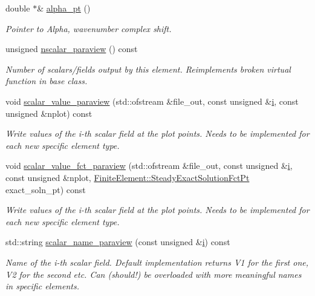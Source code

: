 \begin{DoxyCompactItemize}
double $\ast$\& \hyperlink{classoomph_1_1PMLHelmholtzEquationsBase_aaf031eceaf091f839e349040d88f69bf}{alpha\+\_\+pt} ()
\begin{DoxyCompactList}\small\item\em Pointer to Alpha, wavenumber complex shift. \end{DoxyCompactList}\item 
unsigned \hyperlink{classoomph_1_1PMLHelmholtzEquationsBase_a7829f282edace6ed23d2042defb15186}{nscalar\+\_\+paraview} () const
\begin{DoxyCompactList}\small\item\em Number of scalars/fields output by this element. Reimplements broken virtual function in base class. \end{DoxyCompactList}\item 
void \hyperlink{classoomph_1_1PMLHelmholtzEquationsBase_aaeb408e55bccd67d03e70fe85cb1de9d}{scalar\+\_\+value\+\_\+paraview} (std\+::ofstream \&file\+\_\+out, const unsigned \&\hyperlink{cfortran_8h_adb50e893b86b3e55e751a42eab3cba82}{i}, const unsigned \&nplot) const
\begin{DoxyCompactList}\small\item\em Write values of the i-\/th scalar field at the plot points. Needs to be implemented for each new specific element type. \end{DoxyCompactList}\item 
void \hyperlink{classoomph_1_1PMLHelmholtzEquationsBase_a8285b79905851ee6bed5d8e25435ece2}{scalar\+\_\+value\+\_\+fct\+\_\+paraview} (std\+::ofstream \&file\+\_\+out, const unsigned \&\hyperlink{cfortran_8h_adb50e893b86b3e55e751a42eab3cba82}{i}, const unsigned \&nplot, \hyperlink{classoomph_1_1FiniteElement_a690fd33af26cc3e84f39bba6d5a85202}{Finite\+Element\+::\+Steady\+Exact\+Solution\+Fct\+Pt} exact\+\_\+soln\+\_\+pt) const
\begin{DoxyCompactList}\small\item\em Write values of the i-\/th scalar field at the plot points. Needs to be implemented for each new specific element type. \end{DoxyCompactList}\item 
std\+::string \hyperlink{classoomph_1_1PMLHelmholtzEquationsBase_a35e78df31905f647be50f39eb639b503}{scalar\+\_\+name\+\_\+paraview} (const unsigned \&\hyperlink{cfortran_8h_adb50e893b86b3e55e751a42eab3cba82}{i}) const
\begin{DoxyCompactList}\small\item\em Name of the i-\/th scalar field. Default implementation returns V1 for the first one, V2 for the second etc. Can (should!) be overloaded with more meaningful names in specific elements. \end{DoxyCompactList}\item 

\end{DoxyCompactItemize}
